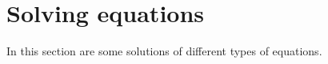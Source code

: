 \documentclass[../main.tex]{subfiles}
\begin{document}

\section{Solving equations}

In this section are some solutions of different types of equations.
\end{document}
